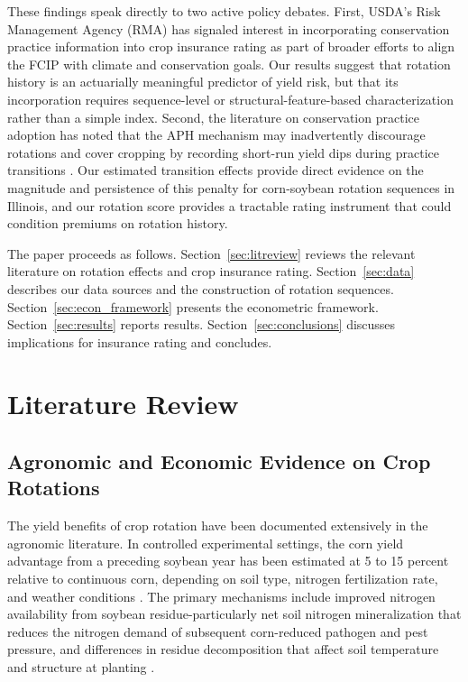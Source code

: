 \documentclass[12pt,letterpaper]{article}
\theoremstyle{remark}
\theoremstyle{remark}
\theoremstyle{plain}
\theoremstyle{definition}
\begin{document}
 
These findings speak directly to two active policy debates. First, USDA's Risk Management Agency (RMA) has signaled interest in incorporating conservation practice information into crop insurance rating as part of broader efforts to align the FCIP with climate and conservation goals. Our results suggest that rotation history is an actuarially meaningful predictor of yield risk, but that its incorporation requires sequence-level or structural-feature-based characterization rather than a simple index. Second, the literature on conservation practice adoption has noted that the APH mechanism may inadvertently discourage rotations and cover cropping by recording short-run yield dips during practice transitions \citep{Connor2022}. Our estimated transition effects provide direct evidence on the magnitude and persistence of this penalty for corn-soybean rotation sequences in Illinois, and our rotation score provides a tractable rating instrument that could condition premiums on rotation history.
 
The paper proceeds as follows. Section~\ref{sec:litreview} reviews the relevant literature on rotation effects and crop insurance rating. Section~\ref{sec:data} describes our data sources and the construction of rotation sequences. Section~\ref{sec:econ_framework} presents the econometric framework. Section~\ref{sec:results} reports results. Section~\ref{sec:conclusions} discusses implications for insurance rating and concludes.

\section{\label{sec:litreview}Literature Review}
\subsection{\label{subsec:agronomy}Agronomic and Economic Evidence on Crop Rotations}

The yield benefits of crop rotation have been documented extensively in the agronomic literature. In controlled experimental settings, the corn yield advantage from a preceding soybean year has been estimated at 5 to 15 percent relative to continuous
corn, depending on soil type, nitrogen fertilization rate, and weather conditions \citep{Gentry2015, Farmaha2016}. The primary mechanisms include improved nitrogen availability from soybean residue-particularly net soil nitrogen mineralization that reduces the nitrogen demand of subsequent corn-reduced pathogen and pest pressure, and differences in residue decomposition that affect soil temperature and structure at planting \citep{Gentry2015}.
 
\end{document}
